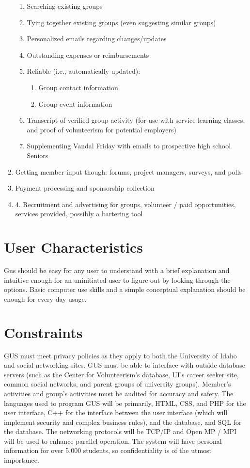 \documentclass[12pt, oneside, letterpaper]{report}
\begin{document}
\begin{enumerate}
\begin{enumerate}
				\item Searching existing groups
				\item Tying together existing groups (even suggesting
					similar groups)
				\item Personalized emails regarding changes/updates
				\item Outstanding expenses or reimbursements
				\item Reliable (i.e., automatically updated):
				\begin{enumerate}
					\item Group contact information
					\item Group event information
				\end{enumerate}
				\item Transcript of verified group activity (for use with
					service-learning classes, and proof of volunteerism
					for potential employers)
				\item Supplementing Vandal Friday with emails to
					prospective high school Seniors
			\end{enumerate}
			\item Getting member input though: forums, project managers,
				surveys, and polls
			\item Payment processing and sponsorship collection
			\item 4. Recruitment and advertising for groups, volunteer
				/ paid opportunities, services provided, possibly a
				bartering tool
		\end{enumerate}
	\section{User Characteristics}
		Gus should be easy for any user to understand with a brief
		explanation and intuitive enough for an uninitiated user to
		figure out by looking through the options. Basic computer use
		skills and a simple conceptual explanation should be enough for
		every day usage.
	\section{Constraints}
		GUS must meet privacy policies as they apply to both the
		University of Idaho and social networking sites.  GUS must be
		able to interface with outside database servers (such as the
		Center for Volunteerism's database, UI's career seeker site,
		common social networks, and parent groups of university groups).
		Member's activities and group's activities must be audited for
		accuracy and safety.  The languages used to program GUS will be
		primarily, HTML, CSS, and PHP for the user interface, C++ for
		the interface between the user interface (which will implement
		security and complex business rules), and the database, and
		SQL for the database.  The networking protocols will be TCP/IP
		and Open MP / MPI will be used to enhance parallel operation.
		The system will have personal information for over 5,000
		students, so confidentiality is of the utmost importance.
\end{document}
